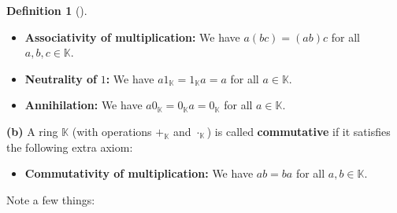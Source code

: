 \documentclass[numbers=enddot,12pt,final,onecolumn,notitlepage]{scrartcl}%
\numberwithin{exer}{subsection}
\theoremstyle{definition}
\newtheorem{defi}[theo]{Definition}
\newenvironment{definition}[1][]
{\begin{defi}[#1]\begin{leftbar}}
{\end{leftbar}\end{defi}}
\begin{document}
\begin{definition}
\begin{itemize}
\item \textbf{Associativity of multiplication:} We have $a\left(  bc\right)
=\left(  ab\right)  c$ for all $a,b,c\in\mathbb{K}$.

\item \textbf{Neutrality of }$1$\textbf{:} We have $a1_{\mathbb{K}%
}=1_{\mathbb{K}}a=a$ for all $a\in\mathbb{K}$.

\item \textbf{Annihilation:} We have $a0_{\mathbb{K}}=0_{\mathbb{K}%
}a=0_{\mathbb{K}}$ for all $a\in\mathbb{K}$.
\end{itemize}

\textbf{(b)} A ring $\mathbb{K}$ (with operations $+_{\mathbb{K}}$ and
$\cdot_{\mathbb{K}}$) is called \textbf{commutative} if it satisfies the
following extra axiom:

\begin{itemize}
\item \textbf{Commutativity of multiplication:} We have $ab=ba$ for all
$a,b\in\mathbb{K}$.
\end{itemize}
\end{definition}

Note a few things:
\end{document}
